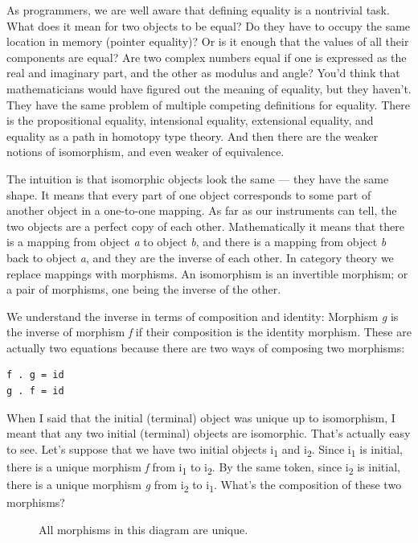 As programmers, we are well aware that defining equality is a nontrivial
task. What does it mean for two objects to be equal? Do they have to
occupy the same location in memory (pointer equality)? Or is it enough
that the values of all their components are equal? Are two complex
numbers equal if one is expressed as the real and imaginary part, and
the other as modulus and angle? You'd think that mathematicians would
have figured out the meaning of equality, but they haven't. They have
the same problem of multiple competing definitions for equality. There
is the propositional equality, intensional equality, extensional
equality, and equality as a path in homotopy type theory. And then there
are the weaker notions of isomorphism, and even weaker of equivalence.

The intuition is that isomorphic objects look the same --- they have the
same shape. It means that every part of one object corresponds to some
part of another object in a one-to-one mapping. As far as our
instruments can tell, the two objects are a perfect copy of each other.
Mathematically it means that there is a mapping from object \emph{a} to
object \emph{b}, and there is a mapping from object \emph{b} back to
object \emph{a}, and they are the inverse of each other. In category
theory we replace mappings with morphisms. An isomorphism is an
invertible morphism; or a pair of morphisms, one being the inverse of
the other.

We understand the inverse in terms of composition and identity: Morphism
\emph{g} is the inverse of morphism \emph{f} if their composition is the
identity morphism. These are actually two equations because there are
two ways of composing two morphisms:

\begin{verbatim}
f . g = id
g . f = id
\end{verbatim}
When I said that the initial (terminal) object was unique up to
isomorphism, I meant that any two initial (terminal) objects are
isomorphic. That's actually easy to see. Let's suppose that we have two
initial objects i\textsubscript{1} and i\textsubscript{2}. Since
i\textsubscript{1} is initial, there is a unique morphism \emph{f} from
i\textsubscript{1} to i\textsubscript{2}. By the same token, since
i\textsubscript{2} is initial, there is a unique morphism \emph{g} from
i\textsubscript{2} to i\textsubscript{1}. What's the composition of
these two morphisms?

\begin{figure}[H]
\centering
{}
\caption{All morphisms in this diagram are unique.}
\end{figure}

